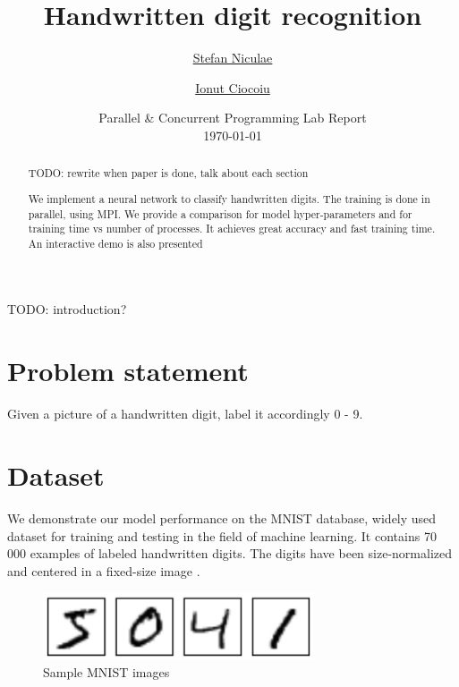 \documentclass[a4paper]{article}
\begin{document}
	\title{
	\Huge Handwritten digit recognition
	}
	
	\vspace{2cm}
	
	\author{\Large \href{mailto:stefan.niculae@my.fmi.unibuc.ro}{Stefan Niculae} \and \Large \href{mailto:ionut.ciocoiu@my.fmi.unibuc.ro}{Ionut Ciocoiu}
	\vspace{3cm}}
	
	\date{
	\large Parallel \& Concurrent Programming Lab Report \\
    \vspace{0.2cm}
	\today
	}

	\maketitle

\vspace{5cm}
\begin{abstract}
TODO: rewrite when paper is done, talk about each section

We implement a neural network to classify handwritten digits. The training is done in parallel, using MPI. We provide a comparison for model hyper-parameters and for training time vs number of processes. It achieves great accuracy and fast training time. An interactive demo is also presented
\end{abstract}






\newpage
TODO: introduction?

\section{Problem statement}
\label{sec:problem}
Given a picture of a handwritten digit, label it accordingly 0 - 9.

\section{Dataset}
\label{sec:dataset}
We demonstrate our model performance on the MNIST database, widely used dataset for training and testing in the field of machine learning. It contains 70 000 examples of labeled handwritten digits. The digits have been size-normalized and centered in a fixed-size image \cite{mnist}. 

\begin{figure}[htb]
\centering
\includegraphics[width=8cm]{images/mnist-images.png}
\caption{Sample MNIST images \cite{tf}}
\end{figure}
\end{document}
